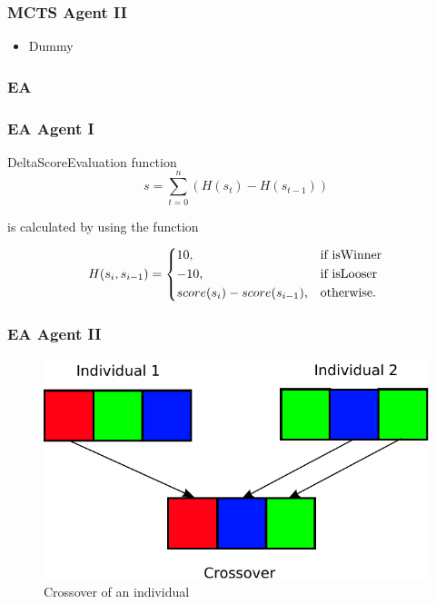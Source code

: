 \documentclass{beamer}
\begin{document}
\begin{frame}
\frametitle{MCTS Agent II}
\begin{itemize}
 \item Dummy
\end{itemize}
\end{frame}


\begin{frame}
\frametitle{EA}


\end{frame}





\begin{frame}
\frametitle{EA Agent I}

DeltaScoreEvaluation function 
\begin{equation*}
s = \sum_{t=0}^n (H(s_t) - H(s_{t-1}))
\end{equation*}

is calculated by using the function

\begin{equation*}
    H(s_i, s_{i-1}) = 
\begin{dcases}
    10, & \text{if isWinner}  \\
    -10, & \text{if isLooser}  \\
    score(s_i) - score(s_{i-1}), & \text{otherwise.}
\end{dcases}
\end{equation*}
\end{frame}



\begin{frame}
\frametitle{EA Agent II}
\begin{figure}[H]
\centering
\includegraphics[scale=0.6]{../report/images/crossover.pdf}
\caption{Crossover of an individual}
\label{fig:crossover}
\end{figure}
\end{frame}
\end{document}
